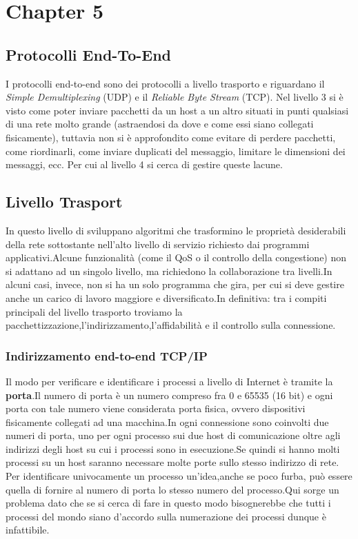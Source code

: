 \chapter{Chapter 5}\label{ch:Chapter5}
\section{Protocolli End-To-End}
I protocolli end-to-end sono dei protocolli a livello trasporto e riguardano il \textit{Simple Demultiplexing} (UDP) e il \textit{Reliable Byte Stream} (TCP). Nel livello 3 si è visto come poter inviare pacchetti da un host a un altro situati in punti qualsiasi di una rete molto grande (astraendosi da dove e come essi siano collegati fisicamente), tuttavia non si è approfondito come evitare di perdere pacchetti, come riordinarli, come inviare duplicati del messaggio, limitare le dimensioni dei messaggi, ecc. Per cui al livello 4 si cerca di gestire queste lacune.
\section{Livello Trasport}
In questo livello di sviluppano algoritmi che trasformino le proprietà desiderabili della rete sottostante nell'alto livello di servizio richiesto dai programmi applicativi.Alcune funzionalità (come il QoS o il controllo della congestione) non si adattano ad un singolo livello, ma richiedono la collaborazione tra livelli.In alcuni casi, invece, non si ha un solo programma che gira, per cui si deve gestire anche un carico di lavoro maggiore e diversificato.In definitiva: tra i compiti principali del livello trasporto troviamo la pacchettizzazione,l'indirizzamento,l'affidabilità e il controllo sulla connessione.
\subsection{Indirizzamento end-to-end TCP/IP}
Il modo per verificare e identificare i processi a livello di Internet è tramite la \textbf{porta}.Il numero di porta è un numero compreso fra 0 e 65535 (16 bit) e ogni porta con tale numero viene considerata porta fisica, ovvero dispositivi fisicamente collegati ad una macchina.In ogni connessione sono coinvolti due numeri di porta, uno per ogni processo sui due host di comunicazione oltre agli indirizzi degli host su cui i processi sono in esecuzione.Se quindi si hanno molti processi su un host saranno necessare molte porte sullo stesso indirizzo di rete. \\
Per identificare univocamente un processo un'idea,anche se poco furba, può essere quella di fornire al numero di porta lo stesso numero del processo.Qui sorge un problema dato che se si cerca di fare in questo modo bisognerebbe che tutti i processi del mondo siano d'accordo sulla numerazione dei processi dunque è infattibile.
